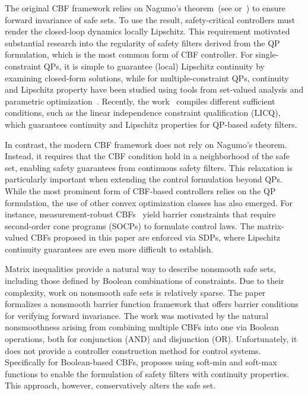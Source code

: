 \documentclass[10pt,twocolumn,twoside]{IEEEtran}
\theoremstyle{definition}
\begin{document}
The original CBF framework relies on Nagumo's theorem~(see \cite{MN:42} or~\cite[Ch. 4.2]{FB-SM:07}) to ensure forward invariance of safe sets. To use the result, safety-critical controllers must render the closed-loop dynamics locally Lipschitz. This requirement motivated substantial research into the regularity of safety filters derived from the QP formulation, which is the most common form of CBF controller. For single-constraint QPs, it is simple to guarantee (local) Lipschitz continuity by examining closed-form solutions, while for multiple-constraint QPs, continuity and Lipschitz property have been studied using tools from set-valued analysis and parametric optimization~\cite{BJM-MJP-ADA:13,BJM-MJP-ADA:15,MJ:18,RAF-PVK:96}. Recently, the work~\cite{PM-AA-JC:25} compiles different sufficient conditions, such as the linear independence constraint qualification (LICQ), which guarantees continuity and Lipschitz properties for QP-based safety filters.

In contrast, the modern CBF framework does not rely on Nagumo's theorem. Instead, it requires that the CBF condition hold in a neighborhood of the safe set, enabling safety guarantees from continuous safety filters. This relaxation is particularly important when extending the control formulation beyond QPs. While the most prominent form of CBF-based controllers relies on the QP formulation, the use of other convex optimization classes has also emerged. For instance, measurement-robust CBFs~\cite{RKC-AWS-AJT-TGM-KLB-ADA:21} yield barrier constraints that require second-order cone programs (SOCPs) to formulate control laws. The matrix-valued CBFs proposed in this paper are enforced via SDPs, where Lipschitz continuity guarantees are even more difficult to establish.

Matrix inequalities provide a natural way to describe nonsmooth safe sets, including those defined by Boolean combinations of constraints. Due to their complexity, work on nonsmooth safe sets is relatively sparse. The paper~\cite{PG-JC-ME:17} formalizes a nonsmooth barrier function framework that offers barrier conditions for verifying forward invariance. The work was motivated by the natural nonsmoothness arising from combining multiple CBFs into one via Boolean operations, both for conjunction (AND) and disjunction (OR). Unfortunately, it does not provide a controller construction method for control systems.
Specifically for Boolean-based CBFs, \cite{TGM-ADA:23} proposes using soft-min and soft-max functions to enable the formulation of safety filters with continuity properties. This approach, however, conservatively alters the safe set.
\end{document}
